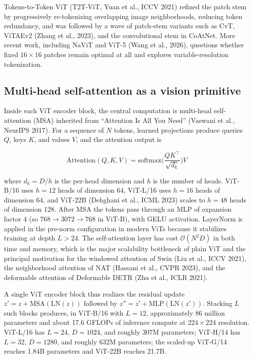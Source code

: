 Tokens-to-Token ViT (T2T-ViT, Yuan et al., ICCV 2021) refined the patch stem by progressively re-tokenizing overlapping image neighborhoods, reducing token redundancy, and was followed by a wave of patch-stem variants such as CvT, ViTAEv2 (Zhang et al., 2023), and the convolutional stem in CoAtNet. More recent work, including NaViT and ViT-5 (Wang et al., 2026), questions whether fixed \(16 \times 16\) patches remain optimal at all and explores variable-resolution tokenization.

\subsection{Multi-head self-attention as a vision primitive}\label{multi-head-self-attention-as-a-vision-primitive}

Inside each ViT encoder block, the central computation is multi-head self-attention (MSA) inherited from ``Attention Is All You Need'' (Vaswani et al., NeurIPS 2017). For a sequence of \(N\) tokens, learned projections produce queries \(Q\), keys \(K\), and values \(V\), and the attention output is

\[\mathrm{Attention}(Q, K, V) = \mathrm{softmax}\!\Big(\frac{QK^{\top}}{\sqrt{d_k}}\Big) V\]

where \(d_k = D/h\) is the per-head dimension and \(h\) is the number of heads. ViT-B/16 uses \(h = 12\) heads of dimension 64, ViT-L/16 uses \(h = 16\) heads of dimension 64, and ViT-22B (Dehghani et al., ICML 2023) scales to \(h = 48\) heads of dimension 128. After MSA the tokens pass through an MLP of expansion factor 4 (so \(768 \to 3072 \to 768\) in ViT-B), with GELU activation. LayerNorm is applied in the pre-norm configuration in modern ViTs because it stabilizes training at depth \(L > 24\). The self-attention layer has cost \(\mathcal{O}(N^2 D)\) in both time and memory, which is the major scalability bottleneck of plain ViT and the principal motivation for the windowed attention of Swin (Liu et al., ICCV 2021), the neighborhood attention of NAT (Hassani et al., CVPR 2023), and the deformable attention of Deformable DETR (Zhu et al., ICLR 2021).

A single ViT encoder block thus realizes the residual update \(z' = z + \mathrm{MSA}(\mathrm{LN}(z))\) followed by \(z'' = z' + \mathrm{MLP}(\mathrm{LN}(z'))\). Stacking \(L\) such blocks produces, in ViT-B/16 with \(L=12\), approximately 86 million parameters and about 17.6 GFLOPs of inference compute at \(224 \times 224\) resolution. ViT-L/16 has \(L=24\), \(D=1024\), and roughly 307M parameters; ViT-H/14 has \(L=32\), \(D=1280\), and roughly 632M parameters; the scaled-up ViT-G/14 reaches 1.84B parameters and ViT-22B reaches 21.7B.


